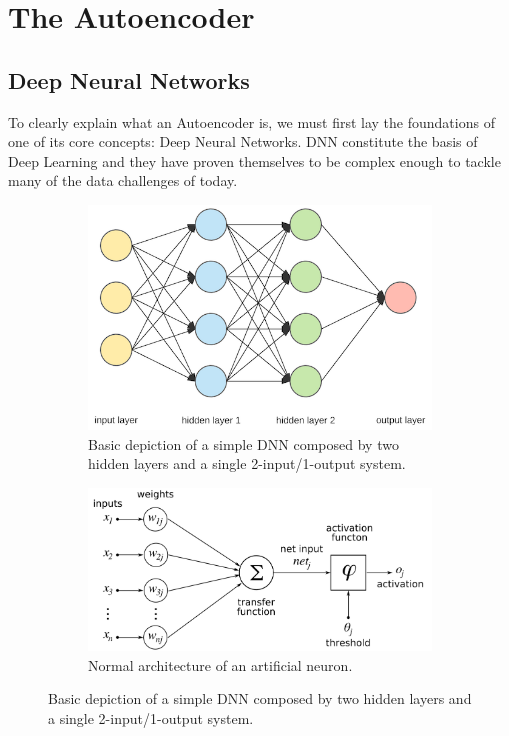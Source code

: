 \section{The Autoencoder}
\subsection{Deep Neural Networks}

To clearly explain what an Autoencoder is, we must first lay the foundations of one of its core concepts: Deep Neural Networks. DNN constitute the basis of Deep Learning and they have proven themselves to be complex enough to tackle many of the data challenges of today. \par

\begin{figure}[H]
\begin{subfigure}{0.65\linewidth}  
 \centering
  \includegraphics[width=\linewidth]{Figuras_tfg/Figure2_tfg}
  \caption{Basic depiction of a simple DNN composed by two hidden layers and a single 2-input/1-output system.}
  \label{fig:fig2a} 
\end{subfigure}

\begin{subfigure}{0.65\linewidth} 
  \centering
  \includegraphics[width=\linewidth]{Figuras_tfg/ArtificialNeuronModel_english.png}
  \caption{Normal architecture of an artificial neuron.}
  \label{fig:fig2b} 
\end{subfigure}
  \caption{Basic depiction of a simple DNN composed by two hidden layers and a single 2-input/1-output system.}
 \label{fig:fig2}
\end{figure}

